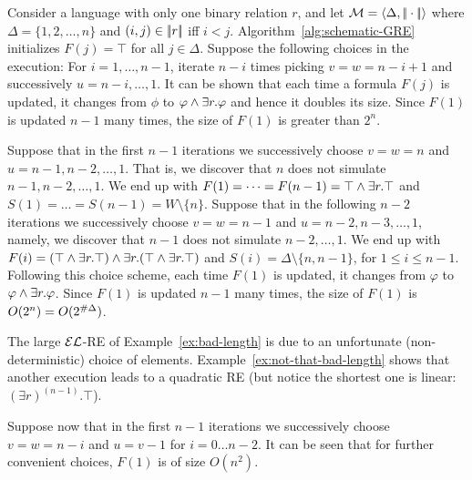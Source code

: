 \begin{example}\label{ex:bad-length}
Consider a language with only one binary relation $r$, and let
$\mathcal{M}=\langle \Delta,|\!|\cdot|\!|\rangle$ where $\Delta=\{1,2,\dots, n\}$
and $(i,j)\in|\!|r|\!|$ iff $i<j$.
Algorithm~\ref{alg:schematic-GRE} initializes $F(j)=\top$ for all
$j\in \Delta$. Suppose the following choices in the execution: For
$i=1,\dots, n-1$, iterate $n-i$ times picking $v=w=n-i+1$ and
successively $u=n-i,\dots, 1$. It can be shown that each time a
formula $F(j)$ %
 is updated, it changes from $\phi$ to
$\varphi\wedge\exists r.\varphi$ and hence it doubles its size.
Since $F(1)$ is updated $n-1$ many times, the size of $F(1)$ is
greater than $2^n$.

\iffullversion Suppose that in the first $n-1$ iterations we
successively choose $v=w=n$ and $u=n-1,n-2,\dots,1$. That is, we
discover that $n$ does not simulate $n-1,n-2,\dots,1$. We end up
with $F(1)=\dots=F(n-1)=\top\wedge\exists r.\top$ and
$S(1)=\dots=S(n-1)=W\setminus\{n\}$. Suppose that in the following
$n-2$ iterations we successively choose $v=w=n-1$ and
$u=n-2,n-3,\dots,1$, namely, we discover that $n-1$ does not
simulate $n-2,\dots,1$. We end up with
$F(i)=(\top\wedge\exists r.\top)\wedge \exists r.(\top\wedge\exists r.\top)$ and
$S(i)=\Delta\setminus\{n,n-1\}$, for $1 \le i \le n-1$. Following
this choice scheme, each time $F(1)$ is updated, it changes from
$\varphi$ to $\varphi\wedge\exists r.\varphi$. Since $F(1)$ is updated
$n-1$ many times, the size of $F(1)$ is
$O(2^n)=O(2^{\# \Delta})$. \fi
\end{example}

The large $\mathcal{EL}$-RE of Example~\ref{ex:bad-length} is due to an
unfortunate (non-deterministic) choice of elements.
Example~\ref{ex:not-that-bad-length} shows that another execution
 leads to a quadratic RE (but notice the
shortest one is linear: $(\exists r)^{(n-1)}.\top$).

\begin{example}\label{ex:not-that-bad-length}
Suppose now that in the first $n-1$ iterations we successively
choose $v=w=n-i$ and $u=v-1$ for $i=0\dots n-2$. It can be seen that
for further convenient choices, $F(1)$ is of size
$O(n^2)$.%
%
%
\end{example}

